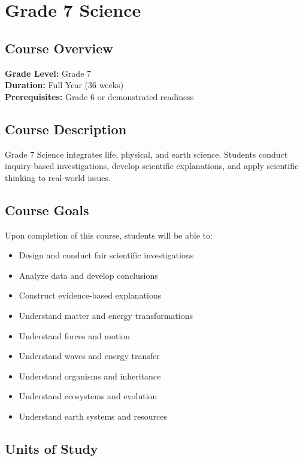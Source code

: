 \documentclass[11pt,letterpaper]{report}
\begin{document}
\chapter{Grade 7 Science}

\section{Course Overview}

\textbf{Grade Level:} Grade 7\\
\textbf{Duration:} Full Year (36 weeks)\\
\textbf{Prerequisites:} Grade 6 or demonstrated readiness

\section{Course Description}

Grade 7 Science integrates life, physical, and earth science. Students conduct inquiry-based investigations, develop scientific explanations, and apply scientific thinking to real-world issues.

\section{Course Goals}

Upon completion of this course, students will be able to:

\begin{itemize}
    \item Design and conduct fair scientific investigations
    \item Analyze data and develop conclusions
    \item Construct evidence-based explanations
    \item Understand matter and energy transformations
    \item Understand forces and motion
    \item Understand waves and energy transfer
    \item Understand organisms and inheritance
    \item Understand ecosystems and evolution
    \item Understand earth systems and resources
\end{itemize}

\section{Units of Study}
\end{document}
